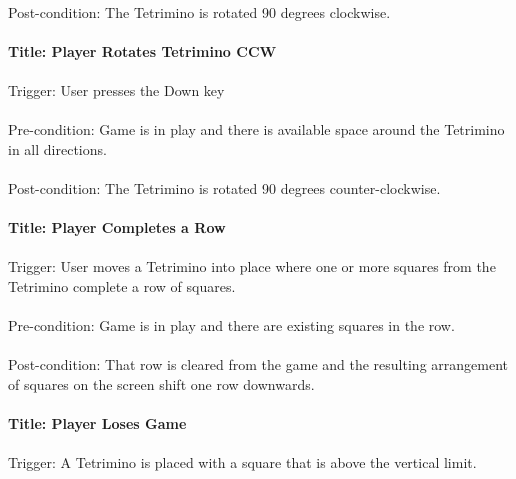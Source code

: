 \documentclass[12pt, titlepage]{article}
\begin{document}
\paragraph{}
Post-condition: The Tetrimino is rotated 90 degrees clockwise.

\paragraph{Title: Player Rotates Tetrimino CCW}
\paragraph{}
Trigger: User presses the Down key
\paragraph{}
Pre-condition: Game is in play and there is available space around the Tetrimino in all directions.
\paragraph{}
Post-condition: The Tetrimino is rotated 90 degrees counter-clockwise.

\paragraph{Title: Player Completes a Row}
\paragraph{}
Trigger: User moves a Tetrimino into place where one or more squares from the Tetrimino complete a row of squares.
\paragraph{}
Pre-condition: Game is in play and there are existing squares in the row.
\paragraph{}
Post-condition: That row is cleared from the game and the resulting arrangement of squares on the screen shift one row 
downwards.

\paragraph{Title: Player Loses Game}
\paragraph{}
Trigger: A Tetrimino is placed with a square that is above the vertical limit.
\end{document}
